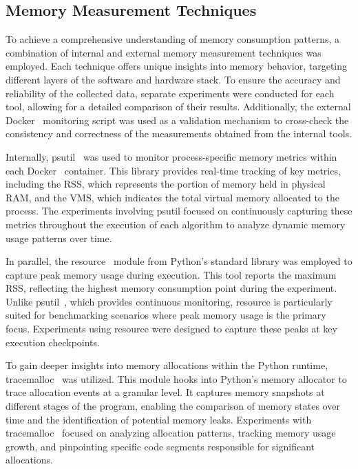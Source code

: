 \subsection{Memory Measurement Techniques}
\label{subsec:mmc-memory-measurement-techniques}

To achieve a comprehensive understanding of memory consumption patterns, a combination of internal and external memory measurement techniques was employed.
Each technique offers unique insights into memory behavior, targeting different layers of the software and hardware stack.
To ensure the accuracy and reliability of the collected data, separate experiments were conducted for each tool, allowing for a detailed comparison of their results.
Additionally, the external Docker~\cite{docker} monitoring script was used as a validation mechanism to cross-check the consistency and correctness of the measurements obtained from the internal tools.

Internally, psutil~\cite{psutil} was used to monitor process-specific memory metrics within each Docker~\cite{docker} container.
This library provides real-time tracking of key metrics, including the \ac{RSS}, which represents the portion of memory held in physical RAM, and the \ac{VMS}, which indicates the total virtual memory allocated to the process.
The experiments involving psutil focused on continuously capturing these metrics throughout the execution of each algorithm to analyze dynamic memory usage patterns over time.

In parallel, the resource~\cite{importlib_resources} module from Python’s standard library was employed to capture peak memory usage during execution.
This tool reports the maximum \ac{RSS}, reflecting the highest memory consumption point during the experiment.
Unlike psutil~\cite{psutil}, which provides continuous monitoring, resource is particularly suited for benchmarking scenarios where peak memory usage is the primary focus.
Experiments using resource were designed to capture these peaks at key execution checkpoints.

To gain deeper insights into memory allocations within the Python runtime, tracemalloc~\cite{tracemalloc} was utilized.
This module hooks into Python’s memory allocator to trace allocation events at a granular level.
It captures memory snapshots at different stages of the program, enabling the comparison of memory states over time and the identification of potential memory leaks.
Experiments with tracemalloc~\cite{tracemalloc} focused on analyzing allocation patterns, tracking memory usage growth, and pinpointing specific code segments responsible for significant allocations.

